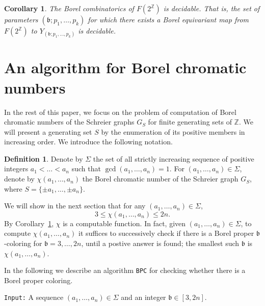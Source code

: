 \documentclass[11pt]{amsart}
\newtheorem{corollary}[theorem]{Corollary}
\theoremstyle{definition}
\newtheorem{definition}[theorem]{Definition}
\def\Z{\mathbb{Z}}
\def\Z{\mathbb{Z}}
\def\bsft{\mathfrak{b}}
\begin{document}
\begin{corollary}\label{cor:decidable} The Borel combinatorics of $F(2^\Z)$ is decidable. That is, the set of parameters $(\bsft; p_1,\dots, p_k)$ for which there exists a Borel equivariant map from $F(2^\Z)$ to $Y_{(\bsft; p_1,\dots, p_k)}$ is decidable.
\end{corollary}
























\section{An algorithm for Borel chromatic numbers}\label{sec:4}

In the rest of this paper, we focus on the problem of computation of Borel chromatic numbers of the Schreier graphs $G_S$ for finite generating sets of $\Z$. We will present a generating set $S$ by the enumeration of its positive members in increasing order. We introduce the following notation.

\begin{definition} Denote by $\Sigma$ the set of all strictly increasing sequence of positive integers $a_1<\dots<a_n$ such that $\gcd(a_1,\dots, a_n)=1$. For $(a_1,\dots, a_n)\in \Sigma$, denote by $\chi(a_1,\dots, a_n)$ the Borel chromatic number of the Schreier graph $G_S$, where $S=\{\pm a_1,\dots, \pm a_n\}$. 
\end{definition}

We will show in the next section that for any $(a_1,\dots, a_n)\in \Sigma$, 
$$ 3\leq \chi(a_1,\dots, a_n)\leq 2n. $$
By Corollary~\ref{cor:decidable}, $\chi$ is a computable function. In fact, given $(a_1,\dots, a_n)\in\Sigma$, to compute $\chi(a_1,\dots, a_n)$ it suffices to successively check if there is a Borel proper $\bsft$-coloring for $\bsft=3, \dots, 2n$, until a postive answer is found; the smallest such $\bsft$ is $\chi(a_1,\dots, a_n)$.

In the following we describe an algorithm {\tt BPC} for checking whether there is a Borel proper coloring.


{\tt Input:} A sequence $(a_1,\dots, a_n)\in \Sigma$ and an integer $\bsft\in [3, 2n]$.
\end{document}

